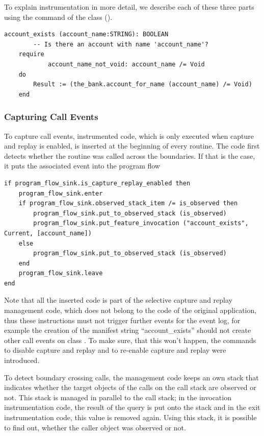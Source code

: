 To explain instrumentation in more detail, we describe each of these three parts using the command  of the class  ().

\begin{lstlisting}[caption=Original Code of Command \feature{account\_exists} ,label=lst:account_exists_original]
account_exists (account_name:STRING): BOOLEAN
		-- Is there an account with name 'account_name'?
	require
			account_name_not_void: account_name /= Void
	do
		Result := (the_bank.account_for_name (account_name) /= Void)
	end
\end{lstlisting}

\subsubsection{Capturing Call Events}
To capture call events, instrumented code, which is only executed when capture and replay is enabled, is inserted at the beginning of every routine. The code first detects whether the routine was called across the boundaries. If that is the case, it puts the associated event into the program flow 
\begin{lstlisting}[caption=Instrumentation Code to Detect Call Events,label=lst:invocation_instrumentation]
if program_flow_sink.is_capture_replay_enabled then
	program_flow_sink.enter
	if program_flow_sink.observed_stack_item /= is_observed then
		program_flow_sink.put_to_observed_stack (is_observed)
		program_flow_sink.put_feature_invocation ("account_exists", Current, [account_name])
	else
		program_flow_sink.put_to_observed_stack (is_observed)
	end
	program_flow_sink.leave
end
\end{lstlisting}
Note that all the inserted code is part of the selective capture and replay management code, which does not belong to the code of the original application, thus these instructions must not trigger further events for the event log, for example the creation of the manifest string ``account\_exists'' should not create other call events on class . To make sure, that this won't happen, the commands  to disable capture and replay and  to re-enable capture and replay were introduced.

To detect boundary crossing calls, the management code keeps an own stack that indicates whether the target objects of the calls on the call stack are observed or not. This stack is managed in parallel to the call stack; in the invocation instrumentation code, the result of the query  is put onto the stack and in the exit instrumentation code, this value is removed again. Using this stack, it is possible to find out, whether the caller object was observed or not.


